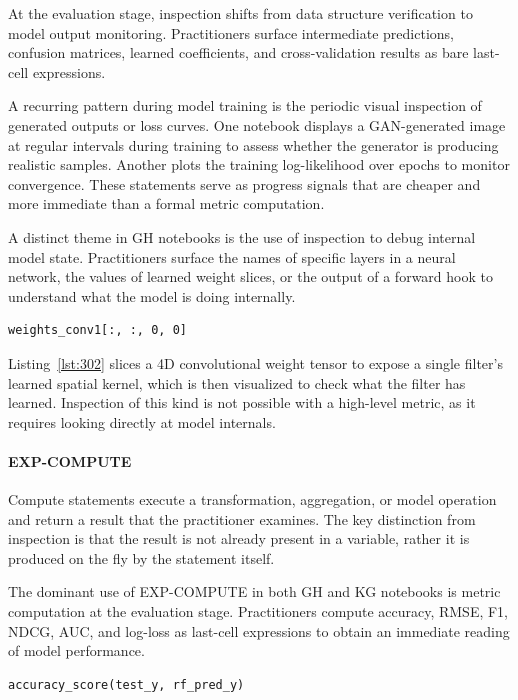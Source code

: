 At the evaluation stage,
inspection shifts from data structure verification to model output monitoring.
Practitioners surface intermediate predictions,
confusion matrices,
learned coefficients,
and cross-validation results
as bare last-cell expressions.

A recurring pattern during model training
is the periodic visual inspection of generated outputs or loss curves.
One notebook displays a GAN-generated image
at regular intervals during training
to assess whether the generator is producing realistic samples.
Another plots the training log-likelihood over epochs
to monitor convergence.
These statements serve as progress signals that are cheaper
and more immediate than a formal metric computation.

A distinct theme in GH notebooks
is the use of inspection to debug internal model state.
Practitioners surface the names of specific layers in a neural network,
the values of learned weight slices,
or the output of a forward hook
to understand what the model is doing internally.

\begin{lstlisting}[caption={}, label={lst:302}]
weights_conv1[:, :, 0, 0]
\end{lstlisting}

Listing~\ref{lst:302} slices a 4D convolutional weight tensor
to expose a single filter's learned spatial kernel,
which is then visualized to check what the filter has learned.
Inspection of this kind is not possible with a high-level metric,
as it requires looking directly at model internals.

\paragraph{EXP-COMPUTE}

Compute statements execute a transformation,
aggregation,
or model operation
and return a result that the practitioner examines.
The key distinction from inspection is that the result is not
already present in a variable,
rather it is produced on the fly by the statement itself.

The dominant use of EXP-COMPUTE in both GH and KG notebooks
is metric computation at the evaluation stage.
Practitioners compute accuracy, RMSE, F1, NDCG, AUC, and log-loss
as last-cell expressions
to obtain an immediate reading of model performance.

\begin{lstlisting}[caption={}, label={lst:339}]
accuracy_score(test_y, rf_pred_y)
\end{lstlisting}

